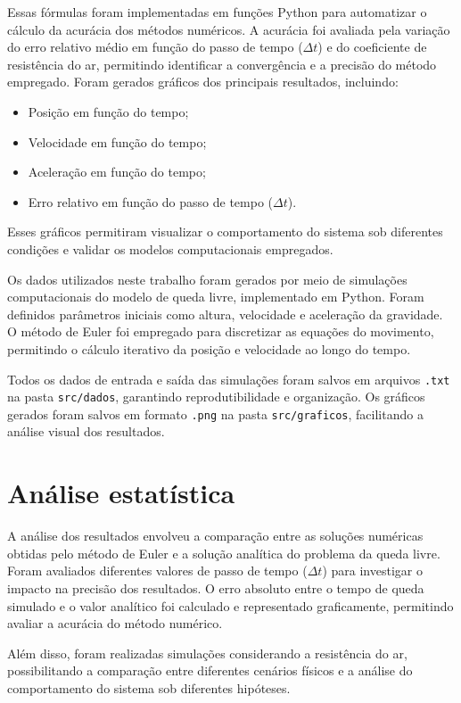 Essas fórmulas foram implementadas em funções Python para automatizar o cálculo da acurácia dos métodos numéricos. A acurácia foi avaliada pela variação do erro relativo médio em função do passo de tempo ($\Delta t$) e do coeficiente de resistência do ar, permitindo identificar a convergência e a precisão do método empregado. Foram gerados gráficos dos principais resultados, incluindo:
\begin{itemize}
	\item Posição em função do tempo;
	\item Velocidade em função do tempo;
	\item Aceleração em função do tempo;
	\item Erro relativo em função do passo de tempo ($\Delta t$).
\end{itemize}
Esses gráficos permitiram visualizar o comportamento do sistema sob diferentes condições e validar os modelos computacionais empregados.
\label{sec_coleta_e_tratamento_de_dados}

Os dados utilizados neste trabalho foram gerados por meio de simulações computacionais do modelo de queda livre, implementado em Python. Foram definidos parâmetros iniciais como altura, velocidade e aceleração da gravidade. O método de Euler foi empregado para discretizar as equações do movimento, permitindo o cálculo iterativo da posição e velocidade ao longo do tempo.

Todos os dados de entrada e saída das simulações foram salvos em arquivos \texttt{.txt} na pasta \texttt{src/dados}, garantindo reprodutibilidade e organização. Os gráficos gerados foram salvos em formato \texttt{.png} na pasta \texttt{src/graficos}, facilitando a análise visual dos resultados.

\section{Análise estatística}
\label{sec_analise_estatistica}

A análise dos resultados envolveu a comparação entre as soluções numéricas obtidas pelo método de Euler e a solução analítica do problema da queda livre. Foram avaliados diferentes valores de passo de tempo ($\Delta t$) para investigar o impacto na precisão dos resultados. O erro absoluto entre o tempo de queda simulado e o valor analítico foi calculado e representado graficamente, permitindo avaliar a acurácia do método numérico.

Além disso, foram realizadas simulações considerando a resistência do ar, possibilitando a comparação entre diferentes cenários físicos e a análise do comportamento do sistema sob diferentes hipóteses.
